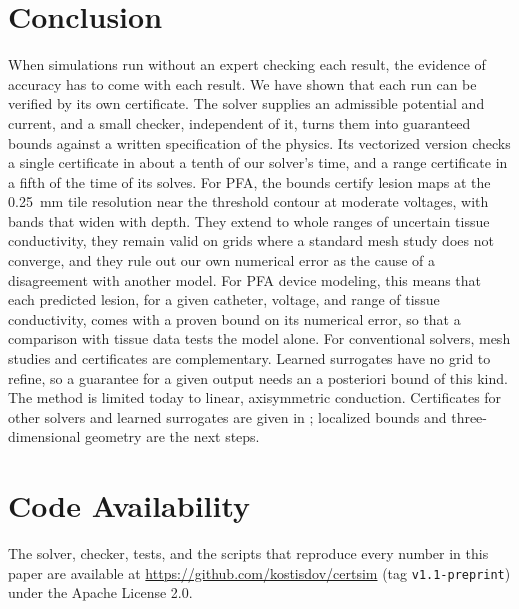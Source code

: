 \documentclass[11pt]{article}
\begin{document}
\section{Conclusion}

When simulations run without an expert checking each result, the evidence of
accuracy has to come with each result. We have shown that each run can be verified by its own
certificate. The solver supplies an admissible potential and current, and a
small checker, independent of it, turns them into guaranteed bounds against a
written specification of the physics. Its vectorized version checks a single
certificate in about a tenth of our solver's time, and a range certificate in a
fifth of the time of its solves. For PFA, the bounds certify lesion maps at the
\SI{0.25}{mm} tile resolution near the threshold contour at moderate voltages,
with bands that widen with depth. They extend to whole ranges of uncertain
tissue conductivity, they remain valid on grids where a standard mesh study
does not converge, and they rule out our own numerical error as the cause of a
disagreement with another model. For PFA device modeling, this means that each
predicted lesion, for a given catheter, voltage, and range of tissue
conductivity, comes with a proven bound on its numerical error, so that a comparison with
tissue data tests the model alone. For conventional solvers, mesh studies
and certificates are complementary. Learned surrogates
have no grid to refine, so a guarantee for a given output needs an a posteriori
bound of this kind. The method is limited today to linear,
axisymmetric conduction. Certificates for other solvers and learned surrogates
are given in \cite{dovelos2026b}; localized bounds and three-dimensional geometry
are the next steps.

\section*{Code Availability}
The solver, checker, tests, and the scripts that reproduce every number in this
paper are available at \url{https://github.com/kostisdov/certsim} (tag
\texttt{v1.1-preprint}) under the Apache License 2.0.
\end{document}
